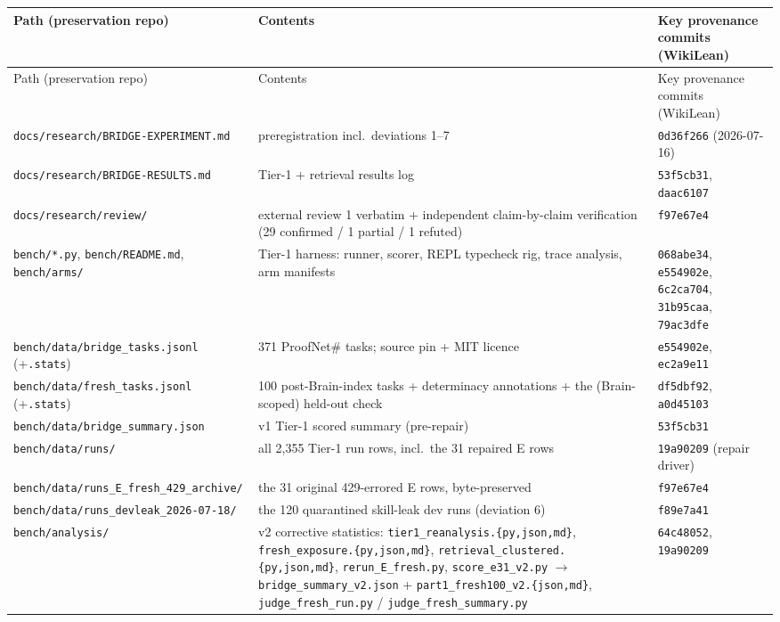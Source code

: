 \documentclass[10pt]{article}
\newcommand{\code}[1]{\texttt{#1}}
\begin{document}
{\scriptsize
\setlength{\tabcolsep}{4pt}
\begin{longtable}{@{}p{}p{}p{}@{}}
\toprule
Path (preservation repo) & Contents & Key provenance commits (WikiLean) \\
\midrule
\endfirsthead
\toprule
Path (preservation repo) & Contents & Key provenance commits (WikiLean) \\
\midrule
\endhead
\bottomrule
\endfoot
\bottomrule
\endlastfoot
\code{docs/research/BRIDGE-EXPERIMENT.md} & preregistration incl.\ deviations 1--7 & \code{0d36f266} (2026-07-16) \\
\code{docs/research/BRIDGE-RESULTS.md} & Tier-1 + retrieval results log & \code{53f5cb31}, \code{daac6107} \\
\code{docs/research/review/} & external review 1 verbatim + independent claim-by-claim verification (29 confirmed / 1 partial / 1 refuted) & \code{f97e67e4} \\
\code{bench/*.py}, \code{bench/README.md}, \code{bench/arms/} & Tier-1 harness: runner, scorer, REPL typecheck rig, trace analysis, arm manifests & \code{068abe34}, \code{e554902e}, \code{6c2ca704}, \code{31b95caa}, \code{79ac3dfe} \\
\code{bench/data/bridge\_tasks.jsonl} (+\code{.stats}) & 371 ProofNet\# tasks; source pin + MIT licence & \code{e554902e}, \code{ec2a9e11} \\
\code{bench/data/fresh\_tasks.jsonl} (+\code{.stats}) & 100 post-Brain-index tasks + determinacy annotations + the (Brain-scoped) held-out check & \code{df5dbf92}, \code{a0d45103} \\
\code{bench/data/bridge\_summary.json} & v1 Tier-1 scored summary (pre-repair) & \code{53f5cb31} \\
\code{bench/data/runs/} & all 2{,}355 Tier-1 run rows, incl.\ the 31 repaired E rows & \code{19a90209} (repair driver) \\
\code{bench/data/runs\_E\_fresh\_429\_archive/} & the 31 original 429-errored E rows, byte-preserved & \code{f97e67e4} \\
\code{bench/data/runs\_devleak\_2026-07-18/} & the 120 quarantined skill-leak dev runs (deviation 6) & \code{f89e7a41} \\
\code{bench/analysis/} & v2 corrective statistics: \code{tier1\_reanalysis.\{py,json,md\}}, \code{fresh\_exposure.\{py,json,md\}}, \code{retrieval\_clustered.\{py,json,md\}}, \code{rerun\_E\_fresh.py}, \code{score\_e31\_v2.py} $\to$ \code{bridge\_summary\_v2.json} + \code{part1\_fresh100\_v2.\{json,md\}}, \code{judge\_fresh\_run.py} / \code{judge\_fresh\_summary.py} & \code{64c48052}, \code{19a90209} \\

\end{longtable}}
\end{document}
